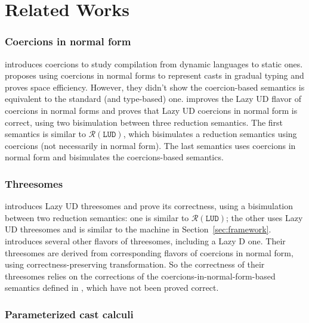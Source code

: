 \documentclass[runningheads]{llncs}
\newcommand{\RMachine}[1]{\ensuremath{\mathcal{R}(#1)}}
\newcommand{\LUDMachine}{\RMachine{\BLUD}}
\newcommand{\BLUD}[0]{\ensuremath{\mathtt{LUD}}}
\begin{document}
\section{Related Works}
\label{chap:related-works}


\subsubsection{Coercions in normal form}

\citet{henglein1994dynamic} introduces coercions to study compilation from 
dynamic languages to static ones. \citet{herman2010space} proposes using 
coercions in normal forms to represent casts in gradual typing and proves space 
efficiency. 
However, they didn't show the coercion-based semantics is equivalent to the 
standard (and type-based) one. \citet{Siek:2015:BCT:2737924.2737968} improves 
the Lazy UD flavor of coercions in normal forms and proves that Lazy UD 
coercions in normal form is correct, using two bisimulation between three 
reduction semantics. The first semantics is similar to \LUDMachine, which 
bisimulates a 
reduction semantics using coercions (not necessarily in normal form). The last 
semantics uses coercions in normal form and bisimulates the coercions-based 
semantics.

\subsubsection{Threesomes}

\citet{Siek:2010:TWB:1706299.1706342} introduces Lazy UD threesomes and prove 
its correctness, using a bisimulation between two reduction semantics: one is 
similar to \LUDMachine; the other uses Lazy UD threesomes and is similar to the 
machine in Section~\ref{sec:framework}. 
\citet{Garcia:2013:CTB:2500365.2500603} introduces several other flavors of 
threesomes, including a Lazy D one. Their threesomes are derived from 
corresponding flavors of coercions in normal form, using correctness-preserving 
transformation. So the correctness of their threesomes relies on the 
corrections of the coercions-in-normal-form-based semantics defined in 
\citet{herman2010space}, which have not been proved correct.

\subsubsection{Parameterized cast calculi}
\end{document}
